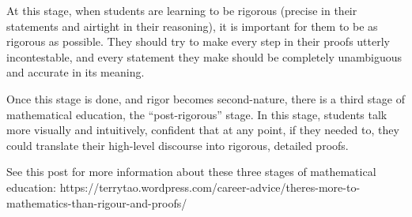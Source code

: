 \documentclass[12pt]{article}
\begin{document}
At this stage, when students are learning to be rigorous (precise in
their statements and airtight in their reasoning), it is important for
them to be as rigorous as possible.  They should try to make every
step in their proofs utterly incontestable, and every statement they
make should be completely unambiguous and accurate in its meaning.

Once this stage is done, and rigor becomes second-nature, there is a
third stage of mathematical education, the ``post-rigorous'' stage.
In this stage, students talk more visually and intuitively, confident
that at any point, if they needed to, they could translate their
high-level discourse into rigorous, detailed proofs.

See this post for more information about these three stages of
mathematical education:
https://terrytao.wordpress.com/career-advice/theres-more-to-mathematics-than-rigour-and-proofs/
\end{document}
